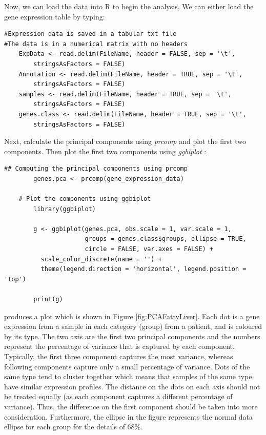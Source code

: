 \documentclass[11pt, oneside]{article}   	%
\begin{document}
Now, we can load the data into R to begin the analysis. We can either load the gene expression table by typing:

\begin{framed}
\begin{verbatim}
#Expression data is saved in a tabular txt file
#The data is in a numerical matrix with no headers
	ExpData <- read.delim(FileName, header = FALSE, sep = '\t', 
		stringsAsFactors = FALSE)
	Annotation <- read.delim(FileName, header = TRUE, sep = '\t', 
		stringsAsFactors = FALSE)
	samples <- read.delim(FileName, header = TRUE, sep = '\t', 
		stringsAsFactors = FALSE)
	genes.class <- read.delim(FileName, header = TRUE, sep = '\t', 
		stringsAsFactors = FALSE)
\end{verbatim}
\end{framed}

Next, calculate the principal components using {\it prcomp} and plot the first two components. Then plot the first two components using {\it ggbiplot} \cite{Vu2016}:    

\begin{framed}
\begin{verbatim}
## Computing the principal components using prcomp
        genes.pca <- prcomp(gene_expression_data)
        
	# Plot the components using ggbiplot
        library(ggbiplot)
        
        g <- ggbiplot(genes.pca, obs.scale = 1, var.scale = 1,
                      groups = genes.class$groups, ellipse = TRUE,
                      circle = FALSE, var.axes = FALSE) +
          scale_color_discrete(name = '') +
          theme(legend.direction = 'horizontal', legend.position = 'top')
        
        print(g)
\end{verbatim}
\end{framed}


 produces a plot which is shown in Figure \ref{fig:PCAFattyLiver}.
Each dot is a gene expression from a sample in each category (group) from a patient, and is coloured by its type.
The two axis are the first two principal components and the numbers represent the percentage of variance that is captured by each component. Typically, the first three component captures the most variance, whereas following components capture only a small percentage of variance.
Dots of the same type tend to cluster together which means that samples of the same type have similar expression profiles.
The distance on the dots on each axis should not be treated equally (as each component captures a different percentage of variance). Thus, the difference on the first component should be taken into more consideration.
Furthermore, the ellipse in the figure represents the normal data ellipse for each group for the details of 68\%. 
\end{document}

